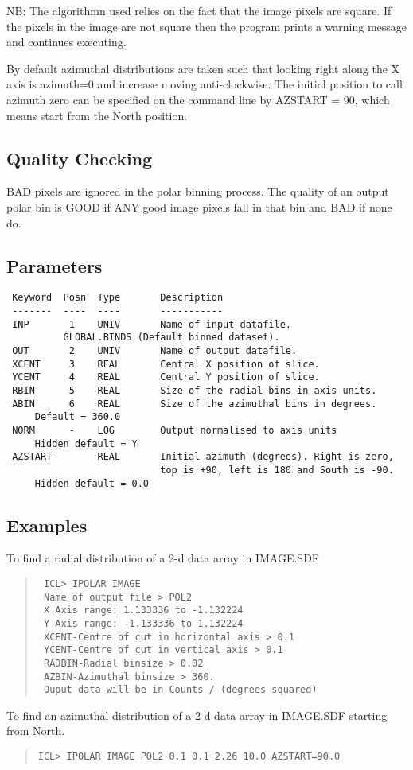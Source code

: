 \documentclass{book}
\renewcommand{\_}{{\tt\char'137}}     %
\begin{document}
NB: The algorithmn used relies on the fact that the image pixels are
square. If the pixels in the image are not square then the program
prints a warning message and continues executing.

By default azimuthal distributions are taken such that looking right
along the X axis is azimuth=0 and increase moving anti-clockwise.
The initial position to call azimuth zero can be specified on the
command line by AZSTART = 90, which means start from the North
position.

\subsection{Quality Checking}
BAD pixels are ignored in the polar binning process. The quality of
an output polar bin is GOOD if ANY good image pixels fall in that
bin and BAD if none do.

\subsection{Parameters}
\begin{verbatim}
 Keyword  Posn  Type       Description
 -------  ----  ----       -----------
 INP       1    UNIV       Name of input datafile.
          GLOBAL.BINDS (Default binned dataset).
 OUT       2    UNIV       Name of output datafile.
 XCENT     3    REAL       Central X position of slice.
 YCENT     4    REAL       Central Y position of slice.
 RBIN      5    REAL       Size of the radial bins in axis units.
 ABIN      6    REAL       Size of the azimuthal bins in degrees.
     Default = 360.0
 NORM      -    LOG        Output normalised to axis units
     Hidden default = Y
 AZSTART        REAL       Initial azimuth (degrees). Right is zero,
                           top is +90, left is 180 and South is -90.
     Hidden default = 0.0

\end{verbatim}\subsection{Examples}
To find a radial distribution of a 2-d data array in IMAGE.SDF
\begin{quote}\begin{verbatim}
 ICL> IPOLAR IMAGE
 Name of output file > POL2
 X Axis range: 1.133336 to -1.132224
 Y Axis range: -1.133336 to 1.132224
 XCENT-Centre of cut in horizontal axis > 0.1
 YCENT-Centre of cut in vertical axis > 0.1
 RADBIN-Radial binsize > 0.02
 AZBIN-Azimuthal binsize > 360.
 Ouput data will be in Counts / (degrees squared)
\end{verbatim}\end{quote}
To find an azimuthal distribution of a 2-d data array in IMAGE.SDF
starting from North.
\begin{quote}\begin{verbatim}
ICL> IPOLAR IMAGE POL2 0.1 0.1 2.26 10.0 AZSTART=90.0
\end{verbatim}\end{quote}
\end{document}
